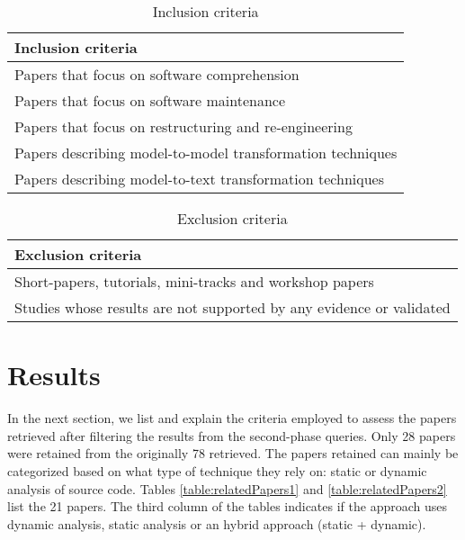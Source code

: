 \begin{table}[ht]
\caption{Inclusion criteria}
\label{table:inclusionCriteria}
\centering
\begin{tabular}{l}
\toprule
\rowcolor[HTML]{BBDAFF}
\textbf{Inclusion criteria}    \\ \hline
  Papers that focus on software comprehension   \\\hline
  Papers that focus on software maintenance \\\hline
  Papers that focus on restructuring and re-engineering  \\\hline
  Papers describing model-to-model transformation techniques  \\\hline
  Papers describing model-to-text transformation techniques  \\\hline
\end{tabular}
\end{table}

\begin{table}[ht]
\caption{Exclusion criteria}
\label{table:exclusionCriteria}
\centering
\begin{tabular}{l}
\toprule
\rowcolor[HTML]{BBDAFF}
\textbf{Exclusion criteria}    \\ \hline
   Short-papers, tutorials, mini-tracks and workshop papers \\ \hline
   Studies whose results are not supported by any evidence or validated \\ \hline
\end{tabular}
\end{table}

\section{Results}

In the next section, we list and explain the criteria employed to assess the papers retrieved after filtering the results from the second-phase queries. Only 28 papers were retained from the originally 78 retrieved. The papers retained can mainly be categorized based on what type of technique they rely on: static or dynamic analysis of source code. Tables \ref{table:relatedPapers1} and \ref{table:relatedPapers2} list the 21 papers. The third column of the tables indicates if the approach uses dynamic analysis, static analysis or an hybrid approach (static + dynamic).

